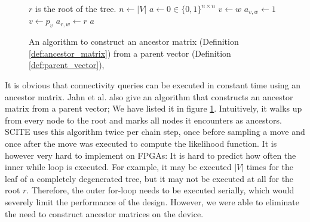 \begin{figure}
    \begin{algorithmic}[1]
         \Comment $r$ is the root of the tree.
            \State $n \leftarrow |V|$
            \State $a \leftarrow 0 \in \{0,1\}^{n \times n}$
                \State $v \leftarrow w$
                    \State $a_{v, w} \leftarrow 1$
                    \State $v \leftarrow p_v$
                \EndWhile
                \State $a_{r, w} \leftarrow r$
            \EndFor
            \State \Return $a$
        \EndFunction
    \end{algorithmic}
    \caption{An algorithm to construct an ancestor matrix (Definition \ref{def:ancestor_matrix}) from a parent vector (Definition \ref{def:parent_vector}), \cite{tree2016}}
    \label{alg:ancestor_matrix}
\end{figure}

It is obvious that connectivity queries can be executed in constant time using an ancestor matrix. Jahn et al. also give an algorithm that constructs an ancestor matrix from a parent vector; We have listed it in figure \ref{alg:ancestor_matrix}. Intuitively, it walks up from every node to the root and marks all nodes it encounters as ancestors. \ac{SCITE} uses this algorithm twice per chain step, once before sampling a move and once after the move was executed to compute the likelihood function. It is however very hard to implement on \acp{FPGA}: It is hard to predict how often the inner while loop is executed. For example, it may be executed $|V|$ times for the leaf of a completely degenerated tree, but it may not be executed at all for the root $r$. Therefore, the outer for-loop needs to be executed serially, which would severely limit the performance of the design. However, we were able to eliminate the need to construct ancestor matrices on the device.

